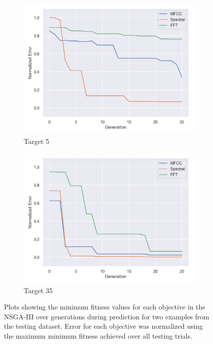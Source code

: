 \begin{figure}[ht]
    \centering
    \begin{subfigure}[b]{0.49\textwidth}
        \centering
        \includegraphics[width=\textwidth]{figures/inverse-synth/nsga_plot_5.png}
        \caption{Target 5}
    \end{subfigure}
    \begin{subfigure}[b]{0.49\textwidth}
        \centering
        \includegraphics[width=\textwidth]{figures/inverse-synth/nsga_plot_35.png}
        \caption{Target 35}
    \end{subfigure}
    \caption{Plots showing the minimum fitness values for each objective in the NSGA-III over generations during prediction for two examples from the testing dataset. Error for each objective was normalized using the maximum minimum fitness achieved over all testing trials.
    }
    \label{fig:nsga-error-generations}
\end{figure}

